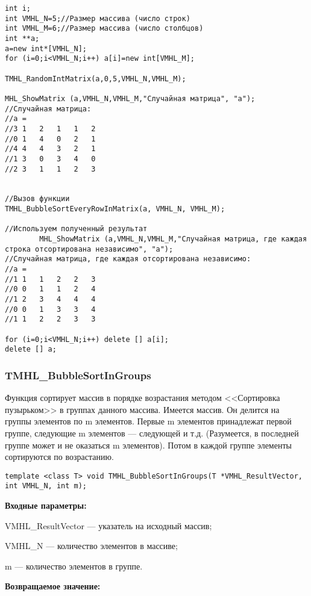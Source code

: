 \documentclass[a4paper,12pt]{article}
\begin{document}
\begin{lstlisting}[label=code_use_TMHL_BubbleSortEveryRowInMatrix,caption=Пример использования]
int i;
int VMHL_N=5;//Размер массива (число строк)
int VMHL_M=6;//Размер массива (число столбцов)
int **a;
a=new int*[VMHL_N];
for (i=0;i<VMHL_N;i++) a[i]=new int[VMHL_M];

TMHL_RandomIntMatrix(a,0,5,VMHL_N,VMHL_M);

MHL_ShowMatrix (a,VMHL_N,VMHL_M,"Случайная матрица", "a");
//Случайная матрица:
//a =
//3	1	2	1	1	2
//0	1	4	0	2	1
//4	4	4	3	2	1
//1	3	0	3	4	0
//2	3	1	1	2	3


//Вызов функции
TMHL_BubbleSortEveryRowInMatrix(a, VMHL_N, VMHL_M);

//Используем полученный результат
		MHL_ShowMatrix (a,VMHL_N,VMHL_M,"Случайная матрица, где каждая строка отсортирована независимо", "a");
//Случайная матрица, где каждая отсортирована независимо:
//a =
//1	1	1	2	2	3
//0	0	1	1	2	4
//1	2	3	4	4	4
//0	0	1	3	3	4
//1	1	2	2	3	3

for (i=0;i<VMHL_N;i++) delete [] a[i];
delete [] a;
\end{lstlisting}

\subsubsection{TMHL\_BubbleSortInGroups}\label{TMHL_BubbleSortInGroups}

Функция сортирует массив в порядке возрастания методом <<Сортировка пузырьком>> в группах данного массива. Имеется массив. Он делится на группы элементов по m элементов. Первые m элементов принадлежат первой группе, следующие m элементов --- следующей и т.д. (Разумеется, в последней группе может и не оказаться m элементов). Потом в каждой группе элементы сортируются по возрастанию.


\begin{lstlisting}[label=code_syntax_TMHL_BubbleSortInGroups,caption=Синтаксис]
template <class T> void TMHL_BubbleSortInGroups(T *VMHL_ResultVector, int VMHL_N, int m);
\end{lstlisting}

\textbf{Входные параметры:}
 
VMHL\_ResultVector --- указатель на исходный массив;
 
VMHL\_N --- количество элементов в массиве;
 
m --- количество элементов в группе.

\textbf{Возвращаемое значение:}
\end{document}
